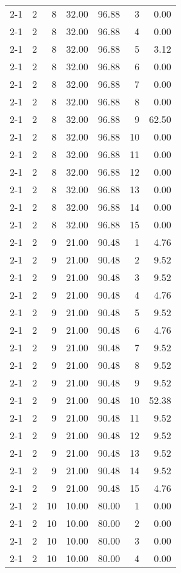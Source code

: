 \begin{tabular}{lrrrrrr}
2-1  & 2 & 8 & 32.00 & 96.88 & 3 & 0.00 \\
2-1  & 2 & 8 & 32.00 & 96.88 & 4 & 0.00 \\
2-1  & 2 & 8 & 32.00 & 96.88 & 5 & 3.12 \\
2-1  & 2 & 8 & 32.00 & 96.88 & 6 & 0.00 \\
2-1  & 2 & 8 & 32.00 & 96.88 & 7 & 0.00 \\
2-1  & 2 & 8 & 32.00 & 96.88 & 8 & 0.00 \\
2-1  & 2 & 8 & 32.00 & 96.88 & 9 & 62.50 \\
2-1  & 2 & 8 & 32.00 & 96.88 & 10 & 0.00 \\
2-1  & 2 & 8 & 32.00 & 96.88 & 11 & 0.00 \\
2-1  & 2 & 8 & 32.00 & 96.88 & 12 & 0.00 \\
2-1  & 2 & 8 & 32.00 & 96.88 & 13 & 0.00 \\
2-1  & 2 & 8 & 32.00 & 96.88 & 14 & 0.00 \\
2-1  & 2 & 8 & 32.00 & 96.88 & 15 & 0.00 \\
2-1  & 2 & 9 & 21.00 & 90.48 & 1 & 4.76 \\
2-1  & 2 & 9 & 21.00 & 90.48 & 2 & 9.52 \\
2-1  & 2 & 9 & 21.00 & 90.48 & 3 & 9.52 \\
2-1  & 2 & 9 & 21.00 & 90.48 & 4 & 4.76 \\
2-1  & 2 & 9 & 21.00 & 90.48 & 5 & 9.52 \\
2-1  & 2 & 9 & 21.00 & 90.48 & 6 & 4.76 \\
2-1  & 2 & 9 & 21.00 & 90.48 & 7 & 9.52 \\
2-1  & 2 & 9 & 21.00 & 90.48 & 8 & 9.52 \\
2-1  & 2 & 9 & 21.00 & 90.48 & 9 & 9.52 \\
2-1  & 2 & 9 & 21.00 & 90.48 & 10 & 52.38 \\
2-1  & 2 & 9 & 21.00 & 90.48 & 11 & 9.52 \\
2-1  & 2 & 9 & 21.00 & 90.48 & 12 & 9.52 \\
2-1  & 2 & 9 & 21.00 & 90.48 & 13 & 9.52 \\
2-1  & 2 & 9 & 21.00 & 90.48 & 14 & 9.52 \\
2-1  & 2 & 9 & 21.00 & 90.48 & 15 & 4.76 \\
2-1  & 2 & 10 & 10.00 & 80.00 & 1 & 0.00 \\
2-1  & 2 & 10 & 10.00 & 80.00 & 2 & 0.00 \\
2-1  & 2 & 10 & 10.00 & 80.00 & 3 & 0.00 \\
2-1  & 2 & 10 & 10.00 & 80.00 & 4 & 0.00 \\

\end{tabular}
